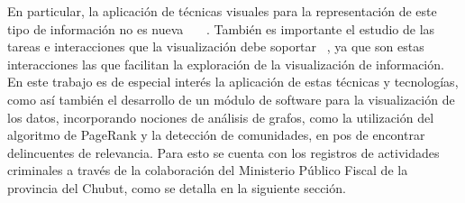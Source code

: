 En particular, la aplicación de técnicas visuales para la representación de este tipo de información no es nueva ~\cite{xu2005criminal}~\cite{feng2019big}~\cite{mathew2021criminal}. También es importante el estudio de las tareas e interacciones que la visualización debe soportar ~\cite{chen2005visualization}, ya que son estas interacciones las que facilitan la exploración de la visualización de información.
En este trabajo es de especial interés la aplicación de estas técnicas y tecnologías, como así también el desarrollo de un módulo de software para  la visualización de los datos, incorporando nociones de análisis de grafos, como la utilización del algoritmo de PageRank y la detección de comunidades, en pos de encontrar delincuentes de relevancia. Para esto se cuenta con los registros de actividades criminales a través de la colaboración del Ministerio Público Fiscal de la provincia del Chubut, como se detalla en la siguiente sección.
